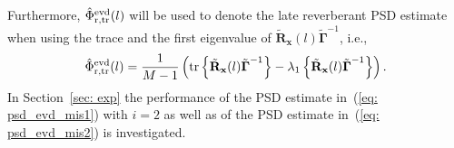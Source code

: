 \documentclass{article}
\begin{document}
Furthermore, $\hat{\Phi}^{\rm evd}_{{\rm r,tr}}(l)$ will be used to denote the late reverberant PSD estimate when using the trace and the first eigenvalue of $\tilde{\mathbf{R}}_{\mathbf{x}}(l) \tilde{\boldsymbol{\Gamma}}^{-1}$, i.e.,
\begin{equation}
\label{eq: psd_evd_mis2}
\hat{\Phi}^{\rm evd}_{{\rm r,tr}}(l) = \frac{1}{M-1}\left( {\rm tr} \left\{ \tilde{\mathbf{R}}_{\mathbf{x}}(l) \tilde{\boldsymbol{\Gamma}}^{-1} \right\} - \lambda_1\left\{\tilde{\mathbf{R}}_{\mathbf{x}}(l)\tilde{\boldsymbol{\Gamma}}^{-1}\right\}\right).
\end{equation}
In Section~\ref{sec: exp} the performance of the PSD estimate in~(\ref{eq: psd_evd_mis1}) with $i = 2$ as well as of the PSD estimate in~(\ref{eq: psd_evd_mis2}) is investigated.

\end{document}
